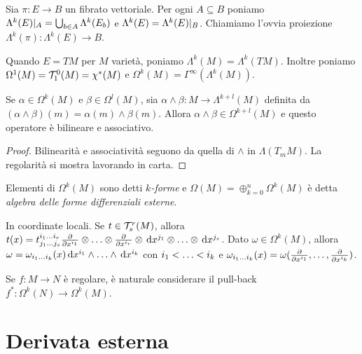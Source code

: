 \begin{definition}
	Sia $\pi : E\to B$ un fibrato vettoriale. Per ogni $A\subseteq B$ poniamo $\Lambda^k(E)\restrict{A} = \bigcup_{b\in A} \Lambda^k(E_b)$ e $\Lambda^k(E) = \Lambda^k(E) \restrict B$.
	Chiamiamo l'ovvia proiezione $\Lambda^k(\pi) : \Lambda^k(E) \to B$.
\end{definition}

Quando $E = TM$ per $M$ varietà, poniamo $\Lambda^k(M) = \Lambda^k(TM)$. Inoltre poniamo $\Omega^1(M) = \Tau^0_1(M) = \chi^*(M)$ e $\Omega^k(M) = \Gamma^\infty(\Lambda^k(M))$.

\begin{proposition}
	Se $\alpha \in \Omega^k(M)$ e $\beta \in \Omega^l(M)$, sia $\alpha \wedge \beta : M \to \Lambda^{k+l}(M)$ definita da $(\alpha\wedge\beta)(m) = \alpha(m) \wedge \beta(m)$. Allora $\alpha\wedge\beta \in \Omega^{k+l}(M)$ e questo operatore è bilineare e associativo.
\end{proposition}
\begin{proof}
	Bilinearità e associatività seguono da quella di $\wedge$ in $\Lambda(T_mM)$. La regolarità si mostra lavorando in carta.
\end{proof}

\begin{definition}
	Elementi di $\Omega^k(M)$ sono detti \emph{$k$-forme} e $\Omega(M) = \oplus_{k=0}^n \Omega^k(M)$ è detta \emph{algebra delle forme differenziali esterne}.
\end{definition}

\begin{remark}
In coordinate locali. Se $t\in\Tau^r_s(M)$, allora $t(x) = t^{\seqb ir{}}_{\seqb js{}} \DerParz{}{x^{i_1}} \otimes \ldots \otimes \DerParz{}{x^{i_r}} \otimes \de x^{j_1} \otimes \ldots \otimes \de x^{j_s}$.
Dato $\omega \in \Omega^k(M)$, allora $\omega = \omega_{\seqb ik{}}(x) \de x^{i_1} \wedge \ldots \wedge \de x^{i_k}$ con $\seqb ik<$ e $\omega_{\seqb ik{}}(x) = \omega(\DerParz{}{x^{i_1}}, \ldots, \DerParz{}{x^{i_k}})$.
\end{remark}

\begin{remark}
	Se $f:M\to N$ è regolare, è naturale considerare il pull-back $f^*: \Omega^k(N) \to \Omega^k(M)$.
\end{remark}

\section{Derivata esterna}

